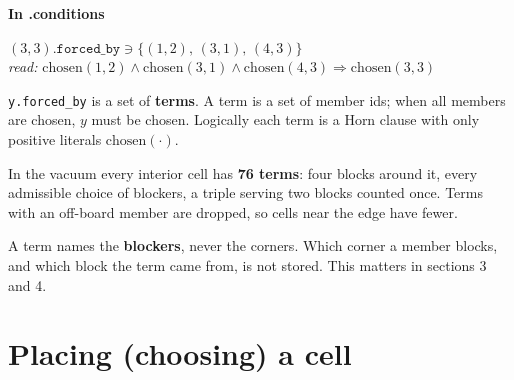 \documentclass[10pt,a4paper]{article}
\newcommand{\interms}{\par\medskip\textsf{\small\bfseries\color{inksoft}In .conditions}\par}
\newcommand{\code}[1]{\texttt{#1}}
\newcommand{\T}[1]{\ensuremath{\{#1\}}}
\newenvironment{algebra}{\begin{center}\begin{minipage}{0.92\linewidth}\small\setlength{\parskip}{0.2em}}{\end{minipage}\end{center}}
\newcommand{\cmt}[1]{{\color{inksoft}\textit{#1}}}
\begin{document}
\interms
\begin{algebra}
$(3,3).\mathtt{forced\_by} \ni \T{(1,2),\,(3,1),\,(4,3)}$\\
\cmt{read: } $\mathrm{chosen}(1,2)\wedge\mathrm{chosen}(3,1)\wedge\mathrm{chosen}(4,3)\Rightarrow\mathrm{chosen}(3,3)$
\end{algebra}
\code{y.forced\_by} is a set of \textbf{terms}. A term is a set of member ids; when all members are chosen, $y$ must be chosen. Logically each term is a Horn clause with only positive literals $\mathrm{chosen}(\cdot)$.

In the vacuum every interior cell has \textbf{76 terms}: four blocks around it, every admissible choice of blockers, a triple serving two blocks counted once. Terms with an off-board member are dropped, so cells near the edge have fewer.

A term names the \textbf{blockers}, never the corners. Which corner a member blocks, and which block the term came from, is not stored. This matters in sections 3 and 4.

\section{Placing (choosing) a cell}
\end{document}
